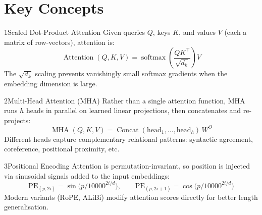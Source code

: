 \section{Key Concepts}

\begin{keybox}{1\enspace Scaled Dot-Product Attention}
Given queries \(Q\), keys \(K\), and values \(V\) (each a matrix of row-vectors),
attention is:
\[
  \operatorname{Attention}(Q,K,V)
  = \operatorname{softmax}\!\left(\frac{QK^{\top}}{\sqrt{d_k}}\right)V
\]
The \(\sqrt{d_k}\) scaling prevents vanishingly small softmax gradients when the
embedding dimension is large.
\end{keybox}

\vspace{5pt}

\begin{keybox}{2\enspace Multi-Head Attention (MHA)}
Rather than a single attention function, MHA runs \(h\) heads in parallel on
learned linear projections, then concatenates and re-projects:
\[
  \operatorname{MHA}(Q,K,V)
  = \operatorname{Concat}(\mathrm{head}_1,\ldots,\mathrm{head}_h)\,W^{O}
\]
Different heads capture complementary relational patterns: syntactic agreement,
coreference, positional proximity, etc.
\end{keybox}

\vspace{5pt}

\begin{keybox}{3\enspace Positional Encoding}
Attention is permutation-invariant, so position is injected via sinusoidal signals
added to the input embeddings:
\[
  \mathrm{PE}_{(p,2i)}   = \sin\!\bigl(p/10000^{2i/d}\bigr),\qquad
  \mathrm{PE}_{(p,2i+1)} = \cos\!\bigl(p/10000^{2i/d}\bigr)
\]
Modern variants (RoPE, ALiBi) modify attention scores directly for better
length generalisation.
\end{keybox}

